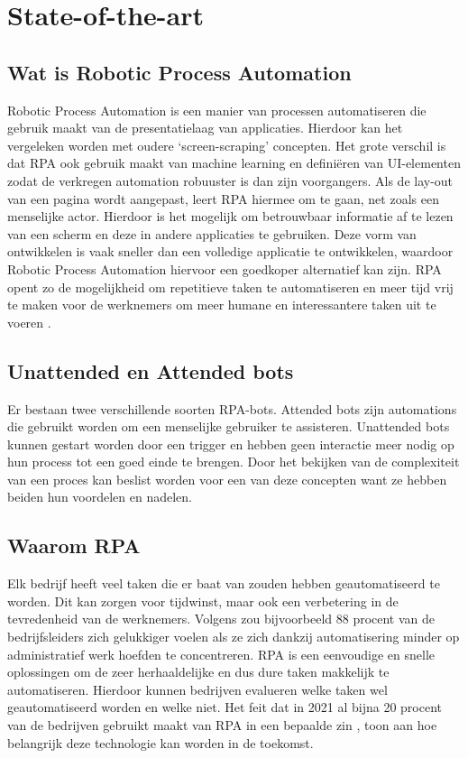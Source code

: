 
\section{State-of-the-art}%
\label{sec:state-of-the-art}

\subsection{Wat is Robotic Process Automation}
\label{Wat is Robotic Process Automation}
Robotic Process Automation is een manier van processen automatiseren die gebruik maakt van de presentatielaag van applicaties. Hierdoor kan het vergeleken worden met oudere ‘screen-scraping’ concepten. Het grote verschil is dat RPA ook gebruik maakt van machine learning en definiëren van UI-elementen zodat de verkregen automation robuuster is dan zijn voorgangers. 
Als de lay-out van een pagina wordt aangepast, leert RPA hiermee om te gaan, net zoals een menselijke actor. Hierdoor is het mogelijk om betrouwbaar informatie af te lezen van een scherm en deze in andere applicaties te gebruiken. Deze vorm van ontwikkelen is vaak sneller dan een volledige applicatie te ontwikkelen, waardoor Robotic Process Automation hiervoor een goedkoper alternatief kan zijn. RPA opent zo de mogelijkheid om repetitieve taken te automatiseren en meer tijd vrij te maken voor de werknemers om meer humane en interessantere taken uit te voeren \autocite{Panikkar2022}.

\subsection{Unattended en Attended bots}
\label{Unattended en Attended bots}
Er bestaan twee verschillende soorten RPA-bots. Attended bots zijn automations die gebruikt worden om een menselijke gebruiker te assisteren. 
Unattended bots kunnen gestart worden door een trigger en hebben geen interactie meer nodig op hun process tot een goed einde te brengen. Door het bekijken van de complexiteit van een proces kan beslist worden voor een van deze concepten want ze hebben beiden hun voordelen en nadelen.

\subsection{Waarom RPA}
\label{Waarom RPA}
Elk bedrijf heeft veel taken die er baat van zouden hebben geautomatiseerd te worden. Dit kan zorgen voor tijdwinst, maar ook een verbetering in de tevredenheid van de werknemers. Volgens \textcite{blueprism2023} zou bijvoorbeeld 88 procent van de bedrijfsleiders zich gelukkiger voelen als ze zich dankzij automatisering minder op administratief werk hoefden te concentreren. RPA is een eenvoudige en snelle oplossingen om de zeer herhaaldelijke en dus dure taken makkelijk te automatiseren. Hierdoor kunnen bedrijven evalueren welke taken wel geautomatiseerd worden en welke niet. Het feit dat in 2021 al bijna 20 procent van de bedrijven gebruikt maakt van RPA in een bepaalde zin \autocite{CemDilmegani2023}, toon aan hoe belangrijk deze technologie kan worden in de toekomst.

